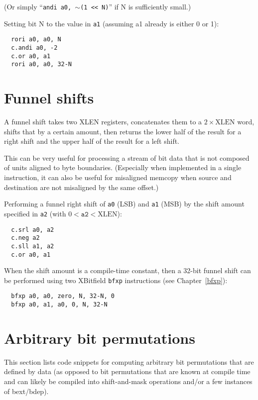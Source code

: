 (Or simply ``{\tt andi a0, $\sim$(1 << N)}'' if N is sufficiently small.)

Setting bit N to the value in {\tt a1} (assuming a1 already is either 0 or 1):

\begin{verbatim}
  rori a0, a0, N
  c.andi a0, -2
  c.or a0, a1
  rori a0, a0, 32-N
\end{verbatim}

\section{Funnel shifts}

A funnel shift takes two XLEN registers, concatenates them to a $2 \times \textrm{XLEN}$ word,
shifts that by a certain amount, then returns the lower half of the result
for a right shift and the upper half of the result for a left shift.

This can be very useful for processing a stream of bit data that is not
composed of units aligned to byte boundaries. (Especially when implemented
in a single instruction, it can also be useful for misaligned memcopy when
source and destination are not misaligned by the same offset.)

Performing a funnel right shift of {\tt a0} (LSB) and {\tt a1} (MSB) by the
shift amount specified in {\tt a2} (with $0 < \texttt{a2} < \textrm{XLEN}$):

\begin{verbatim}
  c.srl a0, a2
  c.neg a2
  c.sll a1, a2
  c.or a0, a1
\end{verbatim}

When the shift amount is a compile-time constant, then a 32-bit funnel shift can be
performed using two XBitfield {\tt bfxp} instructions (see Chapter~\ref{bfxp}):

\begin{verbatim}
  bfxp a0, a0, zero, N, 32-N, 0
  bfxp a0, a1, a0, 0, N, 32-N
\end{verbatim}

\section{Arbitrary bit permutations}

This section lists code snippets for computing arbitrary bit permutations that
are defined by data (as opposed to bit permutations that are known at compile
time and can likely be compiled into shift-and-mask operations and/or a few
instances of bext/bdep).

